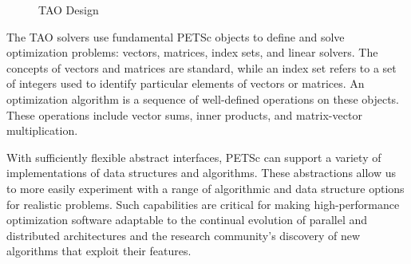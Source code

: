 \begin{figure}[ht]
\caption{TAO Design}
\label{tao:design}
\end{figure}



The TAO solvers use fundamental PETSc objects to define and solve
optimization problems: vectors, matrices, index sets, and linear
solvers.  The concepts of vectors and matrices are standard, while an
index set refers to a set of integers used to identify particular
elements of vectors or matrices.  An optimization algorithm is a
sequence of well-defined operations on these objects.  These
operations include vector sums, inner products, and matrix-vector
multiplication.

With sufficiently flexible abstract interfaces, PETSc can support a
variety of implementations of data structures and algorithms.  These
abstractions allow us to more easily experiment with a range of
algorithmic and data structure options for realistic problems.  
Such capabilities are critical for making
high-performance optimization software adaptable to the continual
evolution of parallel and distributed architectures and the research
community's discovery of new algorithms that exploit their features.


